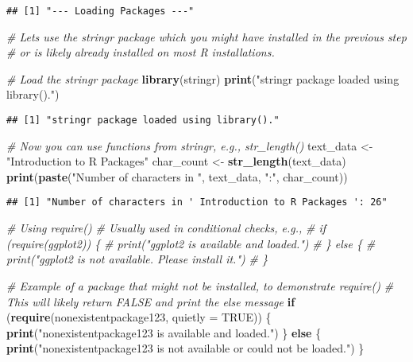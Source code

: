 \documentclass[
]{article}
\newenvironment{Shaded}{\begin{snugshade}}{\end{snugshade}}
\newcommand{\AttributeTok}[1]{\textcolor[rgb]{0.13,0.29,0.53}{#1}}
\newcommand{\CommentTok}[1]{\textcolor[rgb]{0.56,0.35,0.01}{\textit{#1}}}
\newcommand{\ConstantTok}[1]{\textcolor[rgb]{0.56,0.35,0.01}{#1}}
\newcommand{\ControlFlowTok}[1]{\textcolor[rgb]{0.13,0.29,0.53}{\textbf{#1}}}
\newcommand{\FunctionTok}[1]{\textcolor[rgb]{0.13,0.29,0.53}{\textbf{#1}}}
\newcommand{\NormalTok}[1]{#1}
\newcommand{\OtherTok}[1]{\textcolor[rgb]{0.56,0.35,0.01}{#1}}
\newcommand{\StringTok}[1]{\textcolor[rgb]{0.31,0.60,0.02}{#1}}
\begin{document}
\begin{verbatim}
## [1] "--- Loading Packages ---"
\end{verbatim}

\begin{Shaded}
\begin{Highlighting}[]
\CommentTok{\# Let\textquotesingle{}s use the \textquotesingle{}stringr\textquotesingle{} package which you might have installed in the previous step}
\CommentTok{\# or is likely already installed on most R installations.}

\CommentTok{\# Load the stringr package}
\FunctionTok{library}\NormalTok{(stringr)}
\FunctionTok{print}\NormalTok{(}\StringTok{"stringr package loaded using library()."}\NormalTok{)}
\end{Highlighting}
\end{Shaded}

\begin{verbatim}
## [1] "stringr package loaded using library()."
\end{verbatim}

\begin{Shaded}
\begin{Highlighting}[]
\CommentTok{\# Now you can use functions from stringr, e.g., str\_length()}
\NormalTok{text\_data }\OtherTok{\textless{}{-}} \StringTok{"Introduction to R Packages"}
\NormalTok{char\_count }\OtherTok{\textless{}{-}} \FunctionTok{str\_length}\NormalTok{(text\_data)}
\FunctionTok{print}\NormalTok{(}\FunctionTok{paste}\NormalTok{(}\StringTok{"Number of characters in \textquotesingle{}"}\NormalTok{, text\_data, }\StringTok{"\textquotesingle{}:"}\NormalTok{, char\_count))}
\end{Highlighting}
\end{Shaded}

\begin{verbatim}
## [1] "Number of characters in ' Introduction to R Packages ': 26"
\end{verbatim}

\begin{Shaded}
\begin{Highlighting}[]
\CommentTok{\# Using require()}
\CommentTok{\# Usually used in conditional checks, e.g.,}
\CommentTok{\# if (require(ggplot2)) \{}
\CommentTok{\#   print("ggplot2 is available and loaded.")}
\CommentTok{\# \} else \{}
\CommentTok{\#   print("ggplot2 is not available. Please install it.")}
\CommentTok{\# \}}

\CommentTok{\# Example of a package that might not be installed, to demonstrate require()}
\CommentTok{\# This will likely return FALSE and print the \textquotesingle{}else\textquotesingle{} message}
\ControlFlowTok{if}\NormalTok{ (}\FunctionTok{require}\NormalTok{(nonexistentpackage123, }\AttributeTok{quietly =} \ConstantTok{TRUE}\NormalTok{)) \{}
  \FunctionTok{print}\NormalTok{(}\StringTok{"nonexistentpackage123 is available and loaded."}\NormalTok{)}
\NormalTok{\} }\ControlFlowTok{else}\NormalTok{ \{}
  \FunctionTok{print}\NormalTok{(}\StringTok{"nonexistentpackage123 is not available or could not be loaded."}\NormalTok{)}
\NormalTok{\}}
\end{Highlighting}
\end{Shaded}
\end{document}
